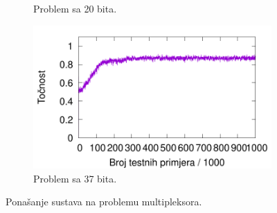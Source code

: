 \documentclass[times, utf8, zavrsni]{fer}
\begin{document}
\begin{figure}
\begin{subfigure}{0.496\textwidth}
        \caption{Problem sa 20 bita.}
        \label{fig:20muxre}
    \end{subfigure}
    \begin{subfigure}{0.496\textwidth}
        \centering
        \includegraphics[width=\textwidth]{img/multiplexer/37muxre.pdf}
        \caption{Problem sa 37 bita.}
        \label{fig:37muxre}
    \end{subfigure}
    \caption{Ponašanje sustava na problemu multipleksora.}
    \label{fig:muxre}
\end{figure}
\end{document}
